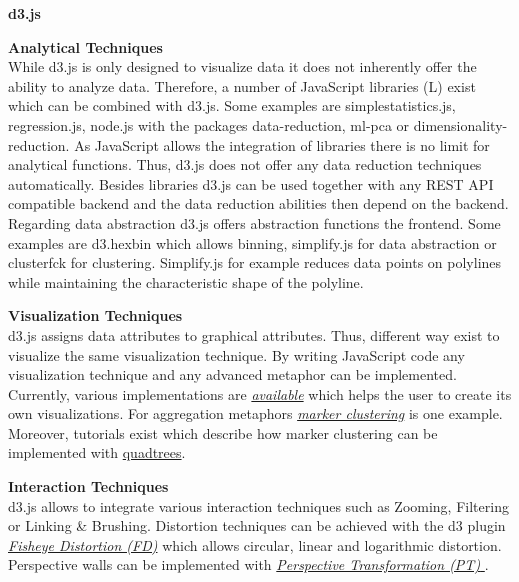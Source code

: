 \par
\noindent \textbf{d3.js}
\par
\textbf{Analytical Techniques}\\
While d3.js is only designed to visualize data it does not inherently offer the ability to analyze data. Therefore, a number of JavaScript libraries (L) exist which can be combined with d3.js. Some examples are simplestatistics.js, regression.js, node.js with the packages data-reduction, ml-pca or dimensionality-reduction. As JavaScript allows the integration of libraries there is no limit for analytical functions. Thus, d3.js does not offer any data reduction techniques automatically. Besides libraries d3.js can be used together with any REST API compatible backend and the data reduction abilities then depend on the backend.
Regarding data abstraction d3.js offers abstraction functions the frontend. Some examples are d3.hexbin which allows binning, simplify.js for data abstraction or clusterfck for clustering. Simplify.js for example reduces data points on polylines while maintaining the characteristic shape of the polyline. 
\par

\textbf{Visualization Techniques}\\
d3.js assigns data attributes to graphical attributes. Thus, different way exist to visualize the same visualization technique. By writing JavaScript code any visualization technique and any advanced metaphor can be implemented. Currently, various implementations are \href{https://github.com/d3/d3/wiki/Gallery}{\textit{available}} which helps the user to create its own visualizations. For aggregation metaphors \href{http://bl.ocks.org/gisminister/10001728}{\textit{marker clustering}} is one example. Moreover, tutorials exist which describe how marker clustering can be implemented with  \href{https://www.phase2technology.com/blog/using-d3-quadtrees-to-power-an-interactive-map-for-bonnier-corporation/}{quadtrees}\cite{Morrison2014}.
\par

\textbf{Interaction Techniques}\\
d3.js allows to integrate various interaction techniques such as Zooming, Filtering or Linking \& Brushing. Distortion techniques can be achieved with the d3 plugin \hyperlink{https://bost.ocks.org/mike/fisheye/}{\textit{Fisheye Distortion (FD)}}\cite{Bostock2012} which allows circular, linear and logarithmic distortion.
Perspective walls can be implemented with \hyperlink{https://bl.ocks.org/mbostock/10571478}{\textit{Perspective Transformation (PT) }}\cite{Bostock2017}.\\

